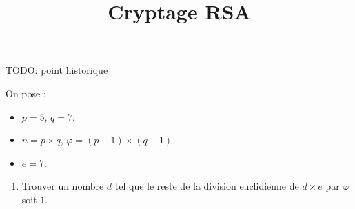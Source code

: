 \documentclass[
	classe=$2^{de}$,
	exercices=Activité
]{exercice}
\title{Cryptage RSA}
\begin{document}
	
\maketitle

TODO: point historique

On pose :
\begin{itemize}
	\item $p = 5$, $q = 7$.
	\item $n = p × q$, $φ = (p - 1) × (q - 1)$.
	\item $e = 7$.
\end{itemize}

\begin{enumerate}
	\item Trouver un nombre $d$ tel que le reste de la division euclidienne de $d × e$ par $φ$ soit $1$.
\end{enumerate}
\end{document}
